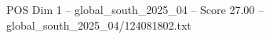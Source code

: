 \begin{textsample}{POS Dim 1 – global\_south\_2025\_04 – Score 27.00 – global\_south\_2025\_04/124081802.txt}
\end{textsample}
